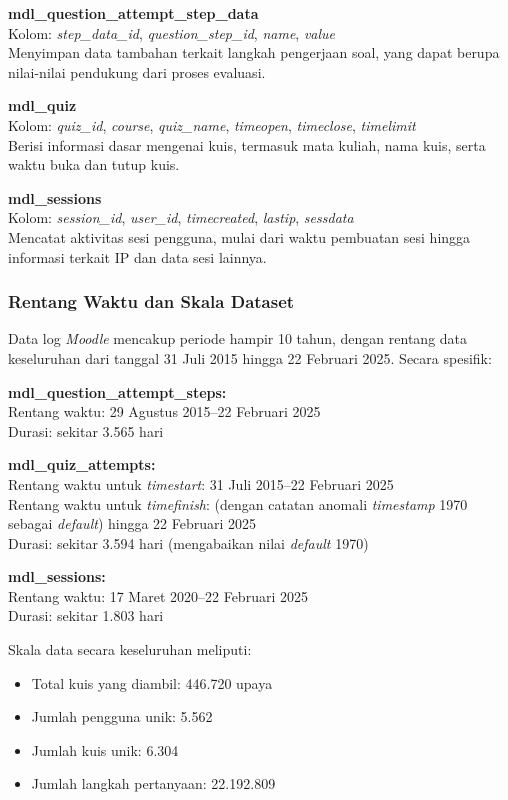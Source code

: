 \textbf{mdl\_question\_attempt\_step\_data} \\
Kolom: \textit{step\_data\_id}, \textit{question\_step\_id}, \textit{name}, \textit{value} \\
Menyimpan data tambahan terkait langkah pengerjaan soal, yang dapat berupa nilai-nilai pendukung dari proses evaluasi.

\textbf{mdl\_quiz} \\
Kolom: \textit{quiz\_id}, \textit{course}, \textit{quiz\_name}, \textit{timeopen}, \textit{timeclose}, \textit{timelimit} \\
Berisi informasi dasar mengenai kuis, termasuk mata kuliah, nama kuis, serta waktu buka dan tutup kuis.

\textbf{mdl\_sessions} \\
Kolom: \textit{session\_id}, \textit{user\_id}, \textit{timecreated}, \textit{lastip}, \textit{sessdata} \\
Mencatat aktivitas sesi pengguna, mulai dari waktu pembuatan sesi hingga informasi terkait IP dan data sesi lainnya.

\subsubsection{Rentang Waktu dan Skala Dataset}
\label{sec:rentangWaktuSkalaDataset}
Data log \textit{Moodle} mencakup periode hampir 10 tahun, dengan rentang data keseluruhan dari tanggal 31 Juli 2015 hingga 22 Februari 2025. Secara spesifik:

\textbf{mdl\_question\_attempt\_steps:} \\
Rentang waktu: 29 Agustus 2015--22 Februari 2025 \\
Durasi: sekitar 3.565 hari

\textbf{mdl\_quiz\_attempts:} \\
Rentang waktu untuk \textit{timestart}: 31 Juli 2015--22 Februari 2025 \\
Rentang waktu untuk \textit{timefinish}: (dengan catatan anomali \textit{timestamp} 1970 sebagai \textit{default}) hingga 22 Februari 2025 \\
Durasi: sekitar 3.594 hari (mengabaikan nilai \textit{default} 1970)

\textbf{mdl\_sessions:} \\
Rentang waktu: 17 Maret 2020--22 Februari 2025 \\
Durasi: sekitar 1.803 hari

Skala data secara keseluruhan meliputi:
\begin{itemize}
    \item Total kuis yang diambil: 446.720 upaya
    \item Jumlah pengguna unik: 5.562
    \item Jumlah kuis unik: 6.304
    \item Jumlah langkah pertanyaan: 22.192.809
\end{itemize}

